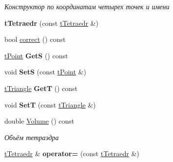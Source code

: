 \begin{DoxyCompactItemize}
\begin{DoxyCompactList}\small\item\em Конструктор по координатам четырех точек и имени \end{DoxyCompactList}\item 
\mbox{\label{classtTetraedr_afd21d86cdbebaf0cd0ce7ad2869a7011}} 
{\bfseries t\+Tetraedr} (const \hyperlink{classtTetraedr}{t\+Tetraedr} \&)
\item 
bool \hyperlink{classtTetraedr_aa8b4ca43b819c0431fb28673b978d3c8}{correct} () const
\item 
\mbox{\label{classtTetraedr_a897b074d2ee556801ba905e123a0f1e9}} 
\hyperlink{classtPoint}{t\+Point} {\bfseries GetS} () const
\item 
\mbox{\label{classtTetraedr_acd33af5079b8e6703b582144dca12b96}} 
void {\bfseries SetS} (const \hyperlink{classtPoint}{t\+Point} \&)
\item 
\mbox{\label{classtTetraedr_aab5ca30306a1915b174bcb6e248f4cae}} 
\hyperlink{classtTriangle}{t\+Triangle} {\bfseries GetT} () const
\item 
\mbox{\label{classtTetraedr_aa7af31f49c73f7ec04cb350723ebfb40}} 
void {\bfseries SetT} (const \hyperlink{classtTriangle}{t\+Triangle} \&)
\item 
\mbox{\label{classtTetraedr_a7acaaa1f874fcff2d52a233297e96217}} 
double \hyperlink{classtTetraedr_a7acaaa1f874fcff2d52a233297e96217}{Volume} () const
\begin{DoxyCompactList}\small\item\em Объём тетраэдра \end{DoxyCompactList}\item 
\mbox{\label{classtTetraedr_a1460b237b37015925bb2da797574d364}} 
\hyperlink{classtTetraedr}{t\+Tetraedr} \& {\bfseries operator=} (const \hyperlink{classtTetraedr}{t\+Tetraedr} \&)
\end{DoxyCompactItemize}

